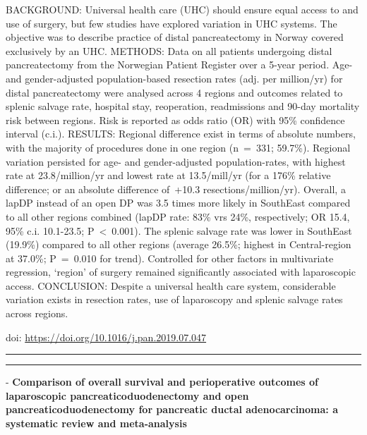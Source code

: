 \documentclass[]{article}
\begin{document}
BACKGROUND: Universal health care (UHC) should ensure equal access to
and use of surgery, but few studies have explored variation in UHC
systems. The objective was to describe practice of distal pancreatectomy
in Norway covered exclusively by an UHC. METHODS: Data on all patients
undergoing distal pancreatectomy from the Norwegian Patient Register
over a 5-year period. Age- and gender-adjusted population-based
resection rates (adj. per million/yr) for distal pancreatectomy were
analysed across 4 regions and outcomes related to splenic salvage rate,
hospital stay, reoperation, readmissions and 90-day mortality risk
between regions. Risk is reported as odds ratio (OR) with 95\%
confidence interval (c.i.). RESULTS: Regional difference exist in terms
of absolute numbers, with the majority of procedures done in one region
(n~=~331; 59.7\%). Regional variation persisted for age- and
gender-adjusted population-rates, with highest rate at 23.8/million/yr
and lowest rate at 13.5/mill/yr (for a 176\% relative difference; or an
absolute difference of~+10.3 resections/million/yr). Overall, a lapDP
instead of an open DP was 3.5 times more likely in SouthEast compared to
all other regions combined (lapDP rate: 83\% vrs 24\%, respectively; OR
15.4, 95\% c.i. 10.1-23.5; P~\textless{}~0.001). The splenic salvage
rate was lower in SouthEast (19.9\%) compared to all other regions
(average 26.5\%; highest in Central-region at 37.0\%; P~=~0.010 for
trend). Controlled for other factors in multivariate regression,
`region' of surgery remained significantly associated with laparoscopic
access. CONCLUSION: Despite a universal health care system, considerable
variation exists in resection rates, use of laparoscopy and splenic
salvage rates across regions.

doi: \url{https://doi.org/10.1016/j.pan.2019.07.047}

{}

{}

\begin{center}\rule{0.5\linewidth}{\linethickness}\end{center}

\begin{center}\rule{0.5\linewidth}{\linethickness}\end{center}

 - \textbf{Comparison of overall survival and perioperative outcomes of
laparoscopic pancreaticoduodenectomy and open pancreaticoduodenectomy
for pancreatic ductal adenocarcinoma: a systematic review and
meta-analysis}
\end{document}
